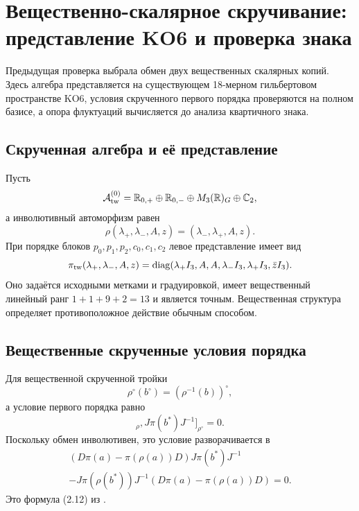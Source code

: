 \chapter{Вещественно-скалярное скручивание: представление KO6 и проверка знака}

Предыдущая проверка выбрала обмен двух вещественных скалярных копий. Здесь
алгебра представляется на существующем 18-мерном гильбертовом пространстве
KO6, условия скрученного первого порядка проверяются на полном базисе, а
опора флуктуаций вычисляется до анализа квартичного знака.

\section{Скрученная алгебра и её представление}

Пусть
\begin{equation}
 \mathcal A_{\rm tw}^{(0)}=\mathbb R_{0,+}\oplus\mathbb R_{0,-}
 \oplus M_3(\mathbb R)_G\oplus\mathbb C_2,
\end{equation}
а инволютивный автоморфизм равен
\begin{equation}
 \rho(\lambda_+,\lambda_-,A,z)=(\lambda_-,\lambda_+,A,z).
 \label{eq:v5-real-flip-rho}
\end{equation}
При порядке блоков \(p_0,p_1,p_2,c_0,c_1,c_2\) левое представление имеет вид
\begin{equation}
 \pi_{\rm tw}(\lambda_+,\lambda_-,A,z)=\operatorname{diag}
 (\lambda_+I_3,A,A,\lambda_-I_3,\lambda_+I_3,\bar zI_3).
 \label{eq:v5-real-flip-representation}
\end{equation}
Оно задаётся исходными метками и градуировкой, имеет вещественный линейный
ранг \(1+1+9+2=13\) и является точным. Вещественная структура определяет
противоположное действие обычным способом.

\section{Вещественные скрученные условия порядка}

Для вещественной скрученной тройки
\begin{equation}
 \rho^\circ(b^\circ)=(\rho^{-1}(b))^\circ,
\end{equation}
а условие первого порядка равно
\begin{equation}
 [[D,\pi(a)]_\rho,J\pi(b^*)J^{-1}]_{\rho^\circ}=0.
 \label{eq:v5-real-twisted-first-order}
\end{equation}
Поскольку обмен инволютивен, это условие разворачивается в
\begin{multline}
 (D\pi(a)-\pi(\rho(a))D)J\pi(b^*)J^{-1}\\
 -J\pi(\rho(b^*))J^{-1}(D\pi(a)-\pi(\rho(a))D)=0.
 \label{eq:v5-real-twisted-first-order-expanded}
\end{multline}
Это формула (2.12) из .

